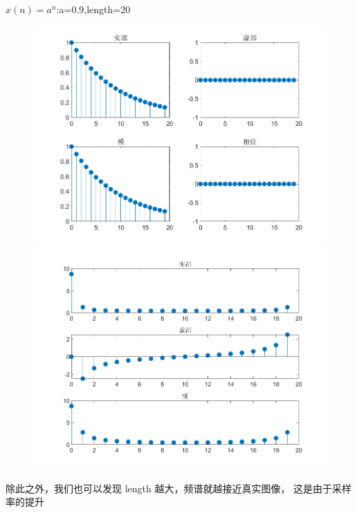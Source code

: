 \documentclass{beamer}
\begin{document}
\begin{frame}{$x(n) = a^n$:a=0.9,length=20}
    \begin{figure}[H]
        \centering
        \begin{minipage}[t]{0.48\textwidth}
        \centering
        \includegraphics[width=\textwidth]{figure/实指数序列_a=09,length=20.png}
        \end{minipage}
        \begin{minipage}[t]{0.48\textwidth}
        \centering
        \includegraphics[width=\textwidth]{figure/频谱_实指数序列_a=09,length=20.png}
        \end{minipage}
    \end{figure}
    \begin{block}{}
        除此之外，我们也可以发现 length 越大，频谱就越接近真实图像，
这是由于采样率的提升
    \end{block}
\end{frame}
\end{document}
